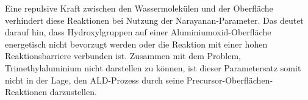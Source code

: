 Eine repulsive Kraft zwischen den Wassermolekülen und der Oberfläche verhindert diese Reaktionen bei Nutzung der Narayanan-Parameter.
Das deutet darauf hin, dass Hydroxylgruppen auf einer Aluminiumoxid-Oberfläche energetisch nicht bevorzugt werden oder die Reaktion mit einer hohen Reaktionsbarriere verbunden ist.
Zusammen mit dem Problem, Trimethylaluminium nicht darstellen zu können, ist dieser Parametersatz somit nicht in der Lage, den ALD-Prozess durch seine Precursor-Oberflächen-Reaktionen darzustellen.

